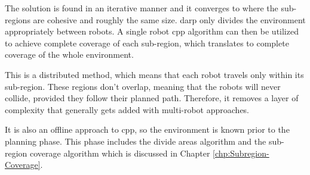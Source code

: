 The solution is found in an iterative manner and it converges to where the sub-regions are cohesive and roughly the same size. \ac{darp} only divides the environment appropriately between robots. A single robot \ac{cpp} algorithm can then be utilized to achieve complete coverage of each sub-region, which translates to complete coverage of the whole environment.

This is a distributed method, which means that each robot travels only within its sub-region. These regions don't overlap, meaning that the robots will never collide, provided they follow their planned path. Therefore, it removes a layer of complexity that generally gets added with multi-robot approaches. 

It is also an offline approach to \ac{cpp}, so the environment is known prior to the planning phase. This phase includes the divide areas algorithm and the sub-region coverage algorithm which is discussed in Chapter \ref{chp:Subregion-Coverage}. 
